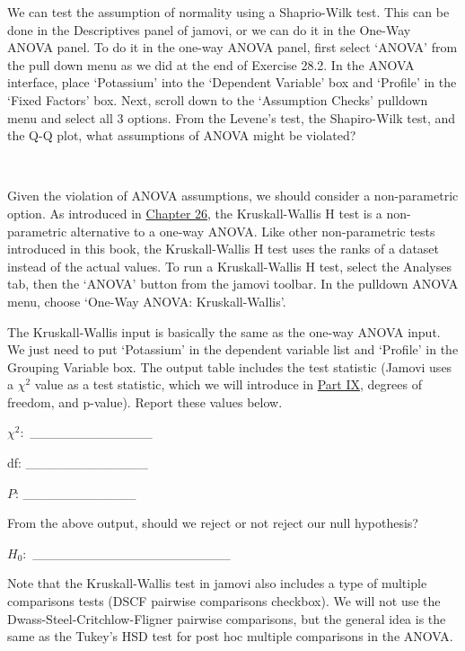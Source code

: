 \documentclass[
  openany]{scrbook}
\begin{document}
We can test the assumption of normality using a Shaprio-Wilk test.
This can be done in the Descriptives panel of jamovi, or we can do it in the One-Way ANOVA panel.
To do it in the one-way ANOVA panel, first select `ANOVA' from the pull down menu as we did at the end of Exercise 28.2.
In the ANOVA interface, place `Potassium' into the `Dependent Variable' box and `Profile' in the `Fixed Factors' box.
Next, scroll down to the `Assumption Checks' pulldown menu and select all 3 options.
From the Levene's test, the Shapiro-Wilk test, and the Q-Q plot, what assumptions of ANOVA might be violated?

\begin{verbatim}


\end{verbatim}

Given the violation of ANOVA assumptions, we should consider a non-parametric option.
As introduced in \protect\hyperlink{Chapter_26}{Chapter 26}, the Kruskall-Wallis H test is a non-parametric alternative to a one-way ANOVA.
Like other non-parametric tests introduced in this book, the Kruskall-Wallis H test uses the ranks of a dataset instead of the actual values.
To run a Kruskall-Wallis H test, select the Analyses tab, then the `ANOVA' button from the jamovi toolbar.
In the pulldown ANOVA menu, choose `One-Way ANOVA: Kruskall-Wallis'.

The Kruskall-Wallis input is basically the same as the one-way ANOVA input.
We just need to put `Potassium' in the dependent variable list and `Profile' in the Grouping Variable box.
The output table includes the test statistic (Jamovi uses a \(\chi^{2}\) value as a test statistic, which we will introduce in \protect\hyperlink{Week9}{Part IX}, degrees of freedom, and p-value).
Report these values below.

\(\chi^{2}:\) \_\_\_\_\_\_\_\_\_\_\_\_\_

df: \_\_\_\_\_\_\_\_\_\_\_\_\_

\(P\): \_\_\_\_\_\_\_\_\_\_\_\_

From the above output, should we reject or not reject our null hypothesis?

\(H_{0}:\) \_\_\_\_\_\_\_\_\_\_\_\_\_\_\_\_\_\_\_\_\_

Note that the Kruskall-Wallis test in jamovi also includes a type of multiple comparisons tests (DSCF pairwise comparisons checkbox).
We will not use the Dwass-Steel-Critchlow-Fligner pairwise comparisons, but the general idea is the same as the Tukey's HSD test for post hoc multiple comparisons in the ANOVA.
\end{document}
